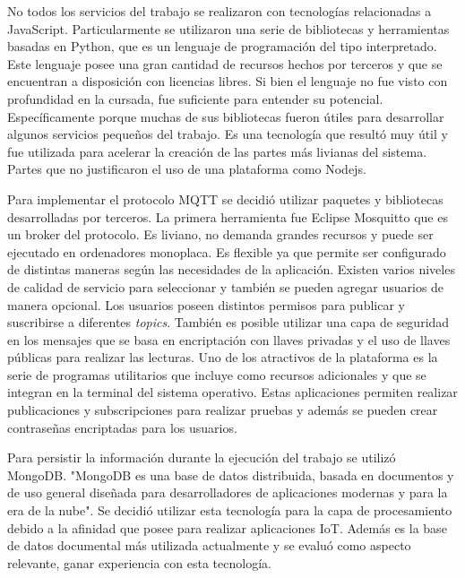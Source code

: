 No todos los servicios del trabajo se realizaron con tecnologías relacionadas a JavaScript.
Particularmente se utilizaron una serie de bibliotecas y herramientas basadas en Python, que es un lenguaje de programación del tipo interpretado.
Este lenguaje posee una gran cantidad de recursos hechos por terceros y que se encuentran a disposición con licencias libres.
Si bien el lenguaje no fue visto con profundidad en la cursada, fue suficiente para entender su potencial.
Específicamente porque muchas de sus bibliotecas fueron útiles para desarrollar algunos servicios pequeños del trabajo.
Es una tecnología que resultó muy útil y fue utilizada para acelerar la creación de las partes más livianas del sistema. Partes que no justificaron el uso de una plataforma como Nodejs.

Para implementar el protocolo MQTT se decidió utilizar paquetes y bibliotecas desarrolladas por terceros.
La primera herramienta fue Eclipse Mosquitto que es un broker del protocolo.
Es liviano, no demanda grandes recursos y puede ser ejecutado en ordenadores monoplaca.
Es flexible ya que permite ser configurado de distintas maneras según las necesidades de la aplicación.
Existen varios niveles de calidad de servicio para seleccionar y también se pueden agregar usuarios de manera opcional.
Los usuarios poseen distintos permisos para publicar y suscribirse a diferentes \emph{topics}.
También es posible utilizar una capa de seguridad en los mensajes que se basa en encriptación con llaves privadas y el uso de llaves públicas para realizar las lecturas.
Uno de los atractivos de la plataforma es la serie de programas utilitarios que incluye como recursos adicionales y que se integran en la terminal del sistema operativo.
Estas aplicaciones permiten realizar publicaciones y subscripciones para realizar pruebas y además se pueden crear contraseñas encriptadas para los usuarios.

Para persistir la información durante la ejecución del trabajo se utilizó MongoDB.
"MongoDB es una base de datos distribuida, basada en documentos y de uso general diseñada para desarrolladores de aplicaciones modernas y para la era de la nube". \citep{WEBSITE:MongoHome}
Se decidió utilizar esta tecnología para la capa de procesamiento debido a la afinidad que posee para realizar aplicaciones IoT.
Además es la base de datos documental más utilizada actualmente \citep{WEBSITE:DBRanking} y se evaluó como aspecto relevante, ganar experiencia con esta tecnología.

